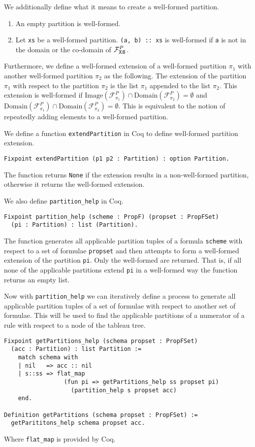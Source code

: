 \documentclass{llncs}
\begin{document}
We additionally define what it means to create a well-formed partition.
%
\begin{enumerate}
\item An empty partition is well-formed.
\item Let \verb+xs+ be a well-formed partition. \verb+(a, b) :: xs+ is
well-formed if \verb+a+ is not in the domain or the co-domain of
$\mathcal{F}^{P}_{\verb+xs+}$.
\end{enumerate}
%
Furthermore, we define a well-formed extension of a well-formed partition
$\pi_1$ with another well-formed partition $\pi_2$ as the following. The
extension of the partition $\pi_1$ with respect to the partition $\pi_2$ is
the list $\pi_1$ appended to the list $\pi_2$. This extension is well-formed
if $\textrm{Image}(\mathcal{F}^{P}_{\pi_1}) \cap
\textrm{Domain}(\mathcal{F}^{P}_{\pi_2}) = \emptyset$ and
$\textrm{Domain}(\mathcal{F}^{P}_{\pi_1}) \cap
\textrm{Domain}(\mathcal{F}^{P}_{\pi_2}) = \emptyset$. This is equivalent to
the notion of repeatedly adding elements to a well-formed partition.

We define a function \verb+extendPartition+ in Coq to define well-formed
partition extension.
%
\begin{verbatim}
Fixpoint extendPartition (p1 p2 : Partition) : option Partition.
\end{verbatim}
%
The function returns \verb+None+ if the extension results in a non-well-formed
partition, otherwise it returns the well-formed extension.

We also define \verb+partition_help+ in Coq.
%
\begin{verbatim}
Fixpoint partition_help (scheme : PropF) (propset : PropFSet)
  (pi : Partition) : list (Partition).
\end{verbatim}
%
The function generates all applicable partition tuples of a formula
\verb+scheme+ with respect to a set of formulae \verb+propset+ and then
attempts to form a well-formed extension of the partition \verb+pi+. Only the
well-formed are returned. That is, if all none of the applicable partitions
extend \verb+pi+ in a well-formed way the function returns an empty list.

Now with \verb+partition_help+ we can iteratively define a process to generate
all applicable partition tuples of a set of formulae with respect to another
set of formulae. This will be used to find the applicable partitions of a
numerator of a rule with respect to a node of the tableau tree.
%
\begin{verbatim}
Fixpoint getPartitions_help (schema propset : PropFSet)
  (acc : Partition) : list Partition :=
    match schema with
    | nil   => acc :: nil
    | s::ss => flat_map
                 (fun pi => getPartitions_help ss propset pi) 
                   (partition_help s propset acc)
    end.

Definition getPartitions (schema propset : PropFSet) :=
  getParititons_help schema propset acc.
\end{verbatim}
%
Where \verb+flat_map+ is provided by Coq.
%
\end{document}
